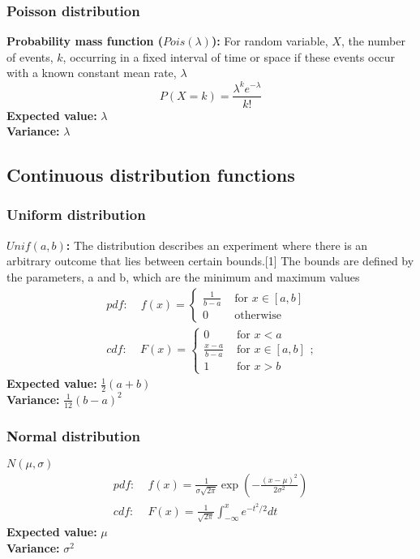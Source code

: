 \documentclass{article}
\begin{document}
\subsubsection{Poisson distribution}
\textbf{Probability mass function ($Pois(\lambda)$):} For random variable, $X$, the number of events, $k$, occurring in a fixed interval of time or space if these events occur with a known constant mean rate, $\lambda$
\begin{equation*}
	P(X = k) = \frac{\lambda^ke^{-\lambda}}{k!}
\end{equation*}
\textbf{Expected value:} $\lambda$\\
\textbf{Variance:} $\lambda$


\subsection{Continuous distribution functions}
\subsubsection{Uniform distribution}
\textbf{$Unif(a, b)$:} The distribution describes an experiment where there is an arbitrary outcome that lies between certain bounds.[1] The bounds are defined by the parameters, a and b, which are the minimum and maximum values
\begin{align*}
    pdf: &\; f(x) = \begin{cases}
        \frac{1}{b-a} & \textrm{ for } x \in [a,b]\\
        0 & \textrm{ otherwise}
    \end{cases}\\
    cdf: &\ F(x) = \begin{cases}
        0 & \textrm{ for } x < a\\
        \frac{x-a}{b-a} & \textrm{ for } x \in [a,b]\\
        1 & \textrm{ for } x > b
    \end{cases}; 
\end{align*}
\textbf{Expected value:} $\frac{1}{2}(a + b)$\\
\textbf{Variance:} $\frac{1}{12}(b - a)^2$

\subsubsection{Normal distribution}
\textbf{$N(\mu, \sigma)$}
\begin{align*}
    pdf: & \; f(x) = \frac{1}{\sigma \sqrt{2 \pi}} \exp \left (-\frac{(x - \mu)^2}{2 \sigma ^ 2}\right )\\
    cdf: & \; F(x) = \frac{1}{\sqrt{2 \pi}} \int_{- \infty}^x e^{-t^2 / 2} dt
\end{align*}
\textbf{Expected value:} $\mu$\\
\textbf{Variance:} $\sigma^2$
\end{document}
